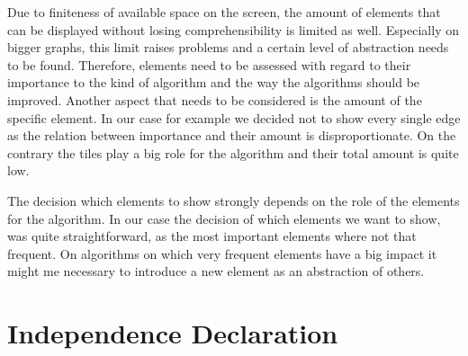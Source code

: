 \documentclass
[
    paper = a4,
    pagesize,
    12 pt,
    oneside,                       %
    open = right,
    DIV = calc,
    BCOR = 0 mm,                   %
    bibtotoc
]
{scrbook}
\begin{document}
Due to finiteness of available space on the screen, the amount of elements that can be displayed without losing comprehensibility is limited as well.
Especially on bigger graphs, this limit raises problems and a certain level of abstraction needs to be found.
Therefore, elements need to be assessed with regard to their importance to the kind of algorithm and the way the algorithms should be improved.
Another aspect that needs to be considered is the amount of the specific element.
In our case for example we decided not to show every single edge as the relation between importance and their amount is disproportionate.
On the contrary the tiles play a big role for the algorithm and their total amount is quite low.

The decision which elements to show strongly depends on the role of the elements for the algorithm.
In our case the decision of which elements we want to show, was quite straightforward, as the most important elements where not that frequent.
On algorithms on which very frequent elements have a big impact it might me necessary to introduce a new element as an abstraction of others.


%




\chapter*{Independence Declaration}

\end{document}
